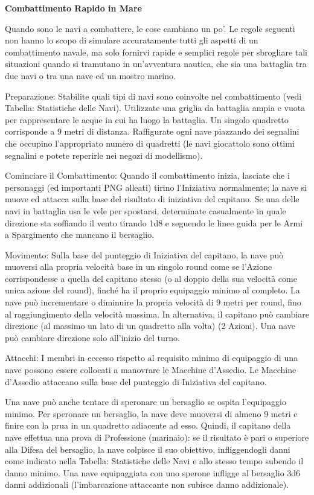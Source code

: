 \documentclass[a4paper,11pt,twoside,openany]{book}
\begin{document}
\textbf{Combattimento Rapido in Mare}

Quando sono le navi a combattere, le cose cambiano un po'. Le regole seguenti non hanno lo scopo di simulare accuratamente tutti gli aspetti di un combattimento navale, ma solo fornirvi rapide e semplici regole per sbrogliare tali situazioni quando si tramutano in un'avventura nautica, che sia una battaglia tra due navi o tra una nave ed un mostro marino.

	{Preparazione:} Stabilite quali tipi di navi sono coinvolte nel combattimento (vedi Tabella: Statistiche delle Navi). Utilizzate una griglia da battaglia ampia e vuota per rappresentare le acque in cui ha luogo la battaglia. Un singolo quadretto corrisponde a 9 metri di distanza. Raffigurate ogni nave piazzando dei segnalini che occupino l'appropriato numero di quadretti (le navi giocattolo sono ottimi segnalini e potete reperirle nei negozi di modellismo).{}

	{Cominciare il Combattimento:} Quando il combattimento inizia, lasciate che i personaggi (ed importanti PNG alleati) tirino l'Iniziativa normalmente; la nave si muove ed attacca sulla base del risultato di iniziativa del capitano. Se una delle navi in battaglia usa le vele per spostarsi, determinate casualmente in quale direzione sta soffiando il vento tirando 1d8 e seguendo le linee guida per le Armi a Spargimento che mancano il bersaglio.{}

	{Movimento:} Sulla base del punteggio di Iniziativa del capitano, la nave può muoversi alla propria velocità base in un singolo round come se l'Azione corrispondesse a quella del capitano stesso (o al doppio della sua velocità come unica azione del round), finché ha il proprio equipaggio minimo al completo. La nave può incrementare o diminuire la propria velocità di 9 metri per round, fino al raggiungimento della velocità massima. In alternativa, il capitano può cambiare direzione (al massimo un lato di un quadretto alla volta) (2 Azioni). Una nave può cambiare direzione solo all'inizio del turno.{}

	{Attacchi:} I membri in eccesso rispetto al requisito minimo di equipaggio di una nave possono essere collocati a manovrare le Macchine d'Assedio. Le Macchine d'Assedio attaccano sulla base del punteggio di Iniziativa del capitano.{}

Una nave può anche tentare di speronare un bersaglio se ospita l'equipaggio minimo. Per speronare un bersaglio, la nave deve muoversi di almeno 9 metri e finire con la prua in un quadretto adiacente ad esso.
Quindi, il capitano della nave effettua una prova di Professione (marinaio): se il risultato è pari o superiore alla Difesa del bersaglio, la nave colpisce il suo obiettivo, infliggendogli danni come indicato nella Tabella: Statistiche delle Navi e allo stesso tempo subendo il danno minimo. Una nave equipaggiata con uno sperone infligge al bersaglio 3d6 danni addizionali (l'imbarcazione attaccante non subisce danno addizionale).
\end{document}
